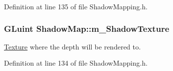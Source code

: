 Definition at line 135 of file Shadow\+Mapping.\+h.

\subsubsection[{\texorpdfstring{m\+\_\+\+Shadow\+Texture}{m_ShadowTexture}}]{\setlength{\rightskip}{0pt plus 5cm}G\+Luint Shadow\+Map\+::m\+\_\+\+Shadow\+Texture\hspace{0.3cm}{\ttfamily [private]}}\hypertarget{class_shadow_map_aebb26b7e83be13b2e812d3d60e646e69}{}\label{class_shadow_map_aebb26b7e83be13b2e812d3d60e646e69}
\hyperlink{struct_texture}{Texture} where the depth will be rendered to. 

Definition at line 134 of file Shadow\+Mapping.\+h.

